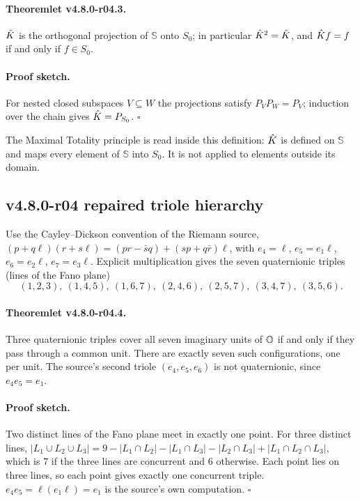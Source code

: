 \paragraph{Theoremlet v4.8.0-r04.3.}
\(\hat{K}\) is the orthogonal projection of \(\mathbb S\) onto \(S_0\); in particular
\(\hat{K}^2=\hat{K}\), and \(\hat{K} f=f\) if and only if \(f\in S_0\).

\paragraph{Proof sketch.}
For nested closed subspaces \(V\subseteq W\) the projections satisfy \(P_VP_W=P_V\); induction
over the chain gives \(\hat{K}=P_{S_0}\).  \(\square\)

The Maximal Totality principle is read inside this definition: \(\hat{K}\) is defined on
\(\mathbb S\) and maps every element of \(\mathbb S\) into \(S_0\).  It is not applied to
elements outside its domain.

\subsection*{v4.8.0-r04 repaired triole hierarchy}
\label{subsec:v480-r04-triole-hierarchy}

Use the Cayley--Dickson convention of the Riemann source,
\((p+q\ell)(r+s\ell)=(pr-\bar sq)+(sp+q\bar r)\ell\), with \(e_4=\ell\), \(e_5=e_1\ell\),
\(e_6=e_2\ell\), \(e_7=e_3\ell\).  Explicit multiplication gives the seven quaternionic triples
(lines of the Fano plane)
\[
(1,2,3),\ (1,4,5),\ (1,6,7),\ (2,4,6),\ (2,5,7),\ (3,4,7),\ (3,5,6).
\]

\paragraph{Theoremlet v4.8.0-r04.4.}
Three quaternionic triples cover all seven imaginary units of \(\mathbb{O}\) if and only if they pass
through a common unit.  There are exactly seven such configurations, one per unit.  The source's
second triole \((e_4,e_5,e_6)\) is not quaternionic, since \(e_4e_5=e_1\).

\paragraph{Proof sketch.}
Two distinct lines of the Fano plane meet in exactly one point.  For three distinct lines,
\(|L_1\cup L_2\cup L_3|=9-|L_1\cap L_2|-|L_1\cap L_3|-|L_2\cap L_3|+|L_1\cap L_2\cap L_3|\),
which is \(7\) if the three lines are concurrent and \(6\) otherwise.  Each point lies on three
lines, so each point gives exactly one concurrent triple.  \(e_4e_5=\ell(e_1\ell)=e_1\) is the
source's own computation.  \(\square\)

